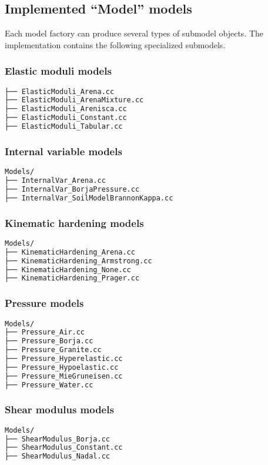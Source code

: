 \subsection{Implemented ``Model'' models}
Each model factory can produce several types of submodel objects.  
The \Vaango implementation contains the following specialized
submodels.

\subsubsection{Elastic moduli models}
\begin{lstlisting}[language=sh, backgroundcolor=\color{background}]
├── ElasticModuli_Arena.cc
├── ElasticModuli_ArenaMixture.cc
├── ElasticModuli_Arenisca.cc
├── ElasticModuli_Constant.cc
├── ElasticModuli_Tabular.cc
\end{lstlisting}

\subsubsection{Internal variable models}
\begin{lstlisting}[language=sh, backgroundcolor=\color{background}]
Models/
├── InternalVar_Arena.cc
├── InternalVar_BorjaPressure.cc
├── InternalVar_SoilModelBrannonKappa.cc
\end{lstlisting}

\subsubsection{Kinematic hardening models}
\begin{lstlisting}[language=sh, backgroundcolor=\color{background}]
Models/
├── KinematicHardening_Arena.cc
├── KinematicHardening_Armstrong.cc
├── KinematicHardening_None.cc
├── KinematicHardening_Prager.cc
\end{lstlisting}

\subsubsection{Pressure models}
\begin{lstlisting}[language=sh, backgroundcolor=\color{background}]
Models/
├── Pressure_Air.cc
├── Pressure_Borja.cc
├── Pressure_Granite.cc
├── Pressure_Hyperelastic.cc
├── Pressure_Hypoelastic.cc
├── Pressure_MieGruneisen.cc
├── Pressure_Water.cc
\end{lstlisting}

\subsubsection{Shear modulus models}
\begin{lstlisting}[language=sh, backgroundcolor=\color{background}]
Models/
├── ShearModulus_Borja.cc
├── ShearModulus_Constant.cc
├── ShearModulus_Nadal.cc
\end{lstlisting}

